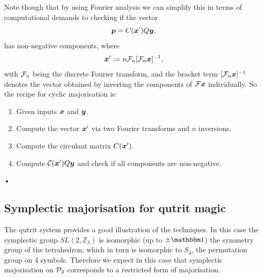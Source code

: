 \documentclass[pra,
aps,
twocolumn,
superscriptaddress,
groupedaddress,
nofootinbib,
reprint
]{revtex4-1}
\begin{document}
Note though that by using Fourier analysis we can simplify this in terms of computational demands to checking if the vector
\begin{equation}
\p = C(\x') Q\y,
\end{equation}
has non-negative components, where
\begin{equation}
\x' := n\F_n [\F_n\x]^{-1},
\end{equation}
with $\F_n$ being the discrete Fourier transform, and the bracket term $[\F_n \x]^{-1}$ denotes the vector obtained by inverting the components of $\F \x$ individually. So the recipe for cyclic majorisation is:
\begin{enumerate}
\item Given inputs $\x$ and $\y$.
\item Compute the vector $\x'$ via two Fourier transforms and $n$ inversions.
\item Compute the circulant matrix $C(\x')$.
\item Compute $\C(\x')Q \y$ and check if all components are non-negative.
\end{enumerate}•


\subsection{Symplectic majorisation for qutrit magic}
The qutrit system provides a good illustration of the techniques. In this case the symplectic group $SL(2,\mathbb{Z}_3)$ is isomorphic (up to $\pm \I$) the symmetry group of the tetrahedron, which in turn is isomorphic to $S_4$, the permutation group on 4 symbols. Therefore we expect in this case that symplectic majorisation on $\P_3$ corresponds to a restricted form of majorisation.
\end{document}
